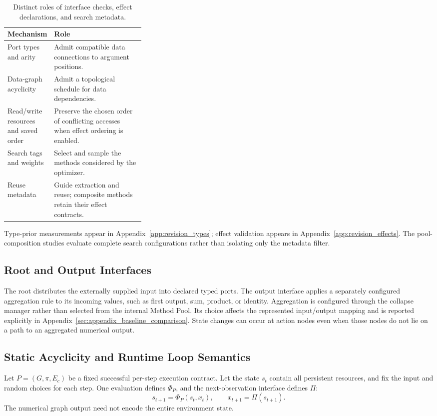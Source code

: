 \begin{table}[tb]
\centering\small
\caption{Distinct roles of interface checks, effect declarations, and search metadata.}
\label{tab:hard-soft}
\begin{tabularx}{\linewidth}{@{}p{0.32\linewidth}X@{}}
\toprule
Mechanism & Role \\
\midrule
Port types and arity & Admit compatible data connections to argument positions. \\
Data-graph acyclicity & Admit a topological schedule for data dependencies. \\
Read/write resources and saved order & Preserve the chosen order of conflicting accesses when effect ordering is enabled. \\
Search tags and weights & Select and sample the methods considered by the optimizer. \\
Reuse metadata & Guide extraction and reuse; composite methods retain their effect contracts. \\
\bottomrule
\end{tabularx}
\end{table}

Type-prior measurements appear in Appendix~\ref{app:revision_types}; effect
validation appears in Appendix~\ref{app:revision_effects}. The pool-composition
studies evaluate complete search configurations rather than isolating only
the metadata filter.

\subsection{Root and Output Interfaces}
\label{sec:supp-boundary-nodes}
The root distributes the externally supplied input into declared typed ports.
The output interface applies a separately configured aggregation rule to its
incoming values, such as first output, sum, product, or identity. Aggregation
is configured through the collapse manager rather than selected from the
internal Method Pool. Its choice affects the represented input/output mapping
and is reported explicitly in Appendix~\ref{sec:appendix_baseline_comparison}.
State changes can occur at action nodes even when those nodes do not lie on a
path to an aggregated numerical output.

\subsection{Static Acyclicity and Runtime Loop Semantics}
\label{app:runtime_loops}
Let $P=(G,\pi,E_c)$ be a fixed successful per-step execution contract. Let the
state $s_t$ contain all persistent resources, and fix the input and random
choices for each step. One evaluation defines $\Phi_P$, and the next-observation
interface defines $\Pi$:
\begin{equation}
\label{eq:closed_loop}
s_{t+1}=\Phi_P(s_t,x_t),\qquad x_{t+1}=\Pi(s_{t+1}).
\end{equation}
The numerical graph output need not encode the entire environment state.

